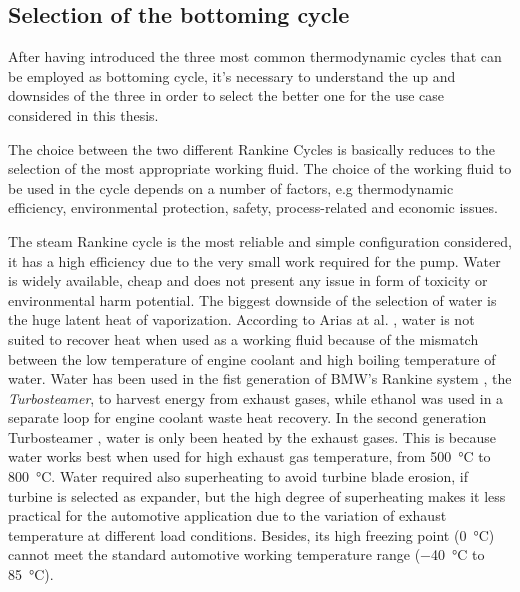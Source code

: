 \subsection{Selection of the bottoming cycle}

After having introduced the three most common thermodynamic cycles that can be employed as bottoming cycle, it's necessary to understand the up and downsides of the three in order to select the better one for the use case considered in this thesis.

The choice between the two different Rankine Cycles is basically reduces to the selection of the most appropriate working fluid. The choice of the working fluid to be used in the cycle depends on a number of factors, e.g thermodynamic efficiency, environmental protection, safety, process-related and economic issues.

The steam Rankine cycle is the most reliable and simple configuration considered, it has a high efficiency due to the very small work required for the pump. Water is widely available, cheap and does not present any issue in form of toxicity or environmental harm potential. The biggest downside of the selection of water is the huge latent heat of vaporization. According to Arias at al. \cite{Arias2006}, water is not suited to recover heat when used as a working fluid because of the mismatch between the low temperature of engine coolant and high boiling temperature of water. Water has been used in the fist generation of BMW's Rankine system \cite{Freymann2008} , the \emph{Turbosteamer}, to harvest energy from exhaust gases, while ethanol was used in a separate loop for engine coolant waste heat recovery. In the second generation Turbosteamer \cite{Freymann2012}, water is only been heated by the exhaust gases. This is because water works best when used for high exhaust gas temperature, from \SI{500}{\celsius} to \SI{800}{\celsius}. Water required also superheating to avoid turbine blade erosion, if turbine is selected as expander, but the high degree of superheating makes it less practical for the automotive application due to the variation of exhaust temperature at different load conditions. Besides, its high freezing point (\SI{0}{\celsius}) cannot meet the standard automotive working temperature range (\SI{-40}{\celsius} to \SI{85}{\celsius}).

